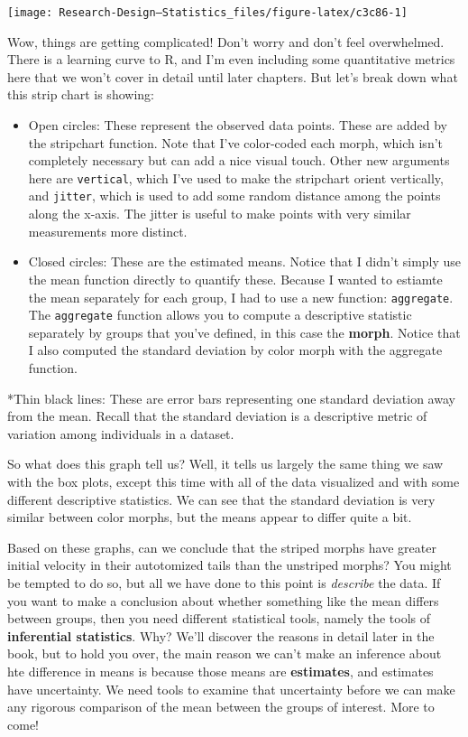 \documentclass[
]{book}
\begin{document}
\begin{center}\texttt{[image: Research-Design---Statistics\_files/figure-latex/c3c86-1]} \end{center}

Wow, things are getting complicated! Don't worry and don't feel overwhelmed. There is a learning curve to R, and I'm even including some quantitative metrics here that we won't cover in detail until later chapters. But let's break down what this strip chart is showing:

\begin{itemize}
\item
  Open circles: These represent the observed data points. These are added by the stripchart function. Note that I've color-coded each morph, which isn't completely necessary but can add a nice visual touch. Other new arguments here are \texttt{vertical}, which I've used to make the stripchart orient vertically, and \texttt{jitter}, which is used to add some random distance among the points along the x-axis. The jitter is useful to make points with very similar measurements more distinct.
\item
  Closed circles: These are the estimated means. Notice that I didn't simply use the mean function directly to quantify these. Because I wanted to estiamte the mean separately for each group, I had to use a new function: \texttt{aggregate}. The \texttt{aggregate} function allows you to compute a descriptive statistic separately by groups that you've defined, in this case the \textbf{morph}. Notice that I also computed the standard deviation by color morph with the aggregate function.
\end{itemize}

*Thin black lines: These are error bars representing one standard deviation away from the mean. Recall that the standard deviation is a descriptive metric of variation among individuals in a dataset.

So what does this graph tell us? Well, it tells us largely the same thing we saw with the box plots, except this time with all of the data visualized and with some different descriptive statistics. We can see that the standard deviation is very similar between color morphs, but the means appear to differ quite a bit.

Based on these graphs, can we conclude that the striped morphs have greater initial velocity in their autotomized tails than the unstriped morphs? You might be tempted to do so, but all we have done to this point is \emph{describe} the data. If you want to make a conclusion about whether something like the mean differs between groups, then you need different statistical tools, namely the tools of \textbf{inferential statistics}. Why? We'll discover the reasons in detail later in the book, but to hold you over, the main reason we can't make an inference about hte difference in means is because those means are \textbf{estimates}, and estimates have uncertainty. We need tools to examine that uncertainty before we can make any rigorous comparison of the mean between the groups of interest. More to come!
\end{document}
